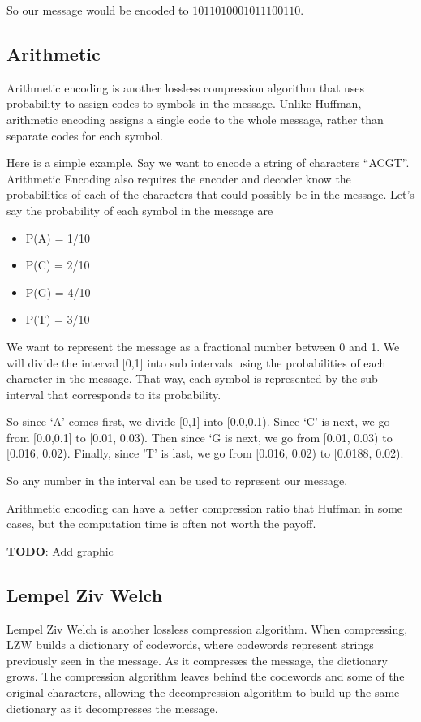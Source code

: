 \documentclass[12pt,twoside]{reedthesis}
\providecommand{\tightlist}{%
  \setlength{\itemsep}{0pt}\setlength{\parskip}{0pt}}
\begin{document}
So our message would be encoded to \(1011010001011100110\).

\hypertarget{arithmetic}{%
\subsection{Arithmetic}\label{arithmetic}}

Arithmetic encoding is another lossless compression algorithm that uses probability to assign codes to symbols in the message. Unlike Huffman, arithmetic encoding assigns a single code to the whole message, rather than separate codes for each symbol.

Here is a simple example. Say we want to encode a string of characters ``ACGT''. Arithmetic Encoding also requires the encoder and decoder know the probabilities of each of the characters that could possibly be in the message. Let's say the probability of each symbol in the message are
\begin{itemize}
\tightlist
\item
  P(A) = 1/10
\item
  P(C) = 2/10
\item
  P(G) = 4/10
\item
  P(T) = 3/10
\end{itemize}
We want to represent the message as a fractional number between 0 and 1. We will divide the interval {[}0,1{]} into sub intervals using the probabilities of each character in the message. That way, each symbol is represented by the sub-interval that corresponds to its probability.

So since `A' comes first, we divide {[}0,1{]} into {[}0.0,0.1). Since `C' is next, we go from {[}0.0,0.1{]} to {[}0.01, 0.03). Then since `G is next, we go from {[}0.01, 0.03) to {[}0.016, 0.02). Finally, since 'T' is last, we go from {[}0.016, 0.02) to {[}0.0188, 0.02).

So any number in the interval can be used to represent our message.

Arithmetic encoding can have a better compression ratio that Huffman in some cases, but the computation time is often not worth the payoff.

\textbf{TODO}: Add graphic

\hypertarget{lempel-ziv-welch}{%
\subsection{Lempel Ziv Welch}\label{lempel-ziv-welch}}

Lempel Ziv Welch is another lossless compression algorithm. When compressing, LZW builds a dictionary of codewords, where codewords represent strings previously seen in the message. As it compresses the message, the dictionary grows. The compression algorithm leaves behind the codewords and some of the original characters, allowing the decompression algorithm to build up the same dictionary as it decompresses the message.
\end{document}
